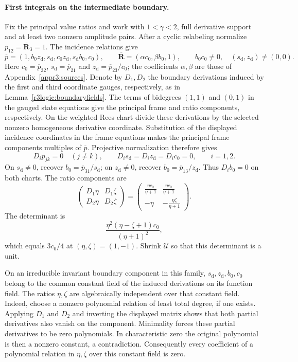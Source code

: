 \documentclass[11pt,a4paper]{article}
\numberwithin{equation}{section}
\theoremstyle{plain}
\theoremstyle{definition}
\theoremstyle{remark}
\begin{document}
\paragraph{First integrals on the intermediate boundary.}
\label{r3logic:boundaryconstants}
Fix the principal value ratios and work with
$1<\gamma<2$, full derivative support and at least two nonzero
amplitude pairs. After a cyclic relabeling normalize
$\overline p_{12}=\overline{\boldsymbol R}_3=1$. The incidence
relations give
\[
 \overline p=(1,b_0z_{\mathrm d},s_{\mathrm d},c_0z_{\mathrm d},s_{\mathrm d}b_0,c_0),\qquad
 \overline{\boldsymbol R}=(\alpha c_0,\beta b_0,1),\qquad
 b_0c_0\ne0,\quad(s_{\mathrm d},z_{\mathrm d})\ne(0,0).
\]
Here $c_0=\overline p_{32}$, $s_{\mathrm d}=\overline p_{21}$ and
$z_{\mathrm d}=\overline p_{23}/c_0$; the coefficients $\alpha,\beta$ are those
of Appendix~\ref{appr3:sources}. Denote by $D_1,D_2$ the boundary
derivations induced by the first and third coordinate gauges,
respectively, as in Lemma~\ref{r3logic:boundaryfields}.
The terms of bidegrees $(1,1)$ and $(0,1)$ in the gauged state
equations give the principal frame and ratio components, respectively.
On the weighted Rees chart divide these derivations by the selected
nonzero homogeneous derivative coordinate.
Substitution of the displayed incidence coordinates in the frame
equations makes the principal frame components multiples of
$\overline p$. Projective normalization therefore gives
\[
 D_i\overline p_{jk}=0\quad(j\ne k),\qquad
 D_i s_{\mathrm d}=D_i z_{\mathrm d}=D_i c_0=0,\qquad i=1,2.
\]
On $s_{\mathrm d}\ne0$, recover $b_0=\overline p_{31}/s_{\mathrm d}$; on $z_{\mathrm d}\ne0$, recover
$b_0=\overline p_{13}/z_{\mathrm d}$. Thus $D_i b_0=0$ on both charts.
The ratio components are
\[
 \begin{pmatrix}
 D_1\eta&D_1\zeta\\
 D_2\eta&D_2\zeta
 \end{pmatrix}
 =
 \begin{pmatrix}
 \displaystyle\frac{\eta c_0}{\eta+1}&
 \displaystyle\frac{\eta c_0}{\eta+1}\\[4pt]
 -\eta&\displaystyle-\frac{\eta\zeta}{\eta+1}
 \end{pmatrix}.
\]
The determinant is
\[
 \frac{\eta^2(\eta-\zeta+1)c_0}{(\eta+1)^2},
\]
which equals $3c_0/4$ at $(\eta,\zeta)=(1,-1)$.
Shrink $\mathscr U$ so that this determinant is a unit.

On an irreducible invariant boundary component in this family,
$s_{\mathrm d},z_{\mathrm d},b_0,c_0$ belong to the common constant field of the induced
derivations on its function field. The ratios $\eta,\zeta$ are
algebraically independent over that constant field. Indeed, choose
a nonzero polynomial relation of least total degree, if one exists.
Applying $D_1$ and $D_2$ and inverting the displayed matrix shows
that both partial derivatives also vanish on the component.
Minimality forces these partial derivatives to be zero polynomials.
In characteristic zero the original polynomial is then a nonzero
constant, a contradiction. Consequently every coefficient of a
polynomial relation in $\eta,\zeta$ over this constant field is zero.
\end{document}
